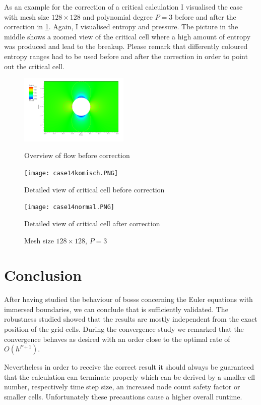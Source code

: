 	As an example for the correction of a critical calculation I visualised the case with mesh size $128 \times 128$ and polynomial degree $P = 3$ before and after the correction in \ref{fig:case14}. Again, I visualised entropy and pressure. The picture in the middle shows a zoomed view of the critical cell where a high amount of entropy was produced and lead to the breakup. Please remark that differently coloured entropy ranges had to be used before and after the correction in order to point out the critical cell.
	\begin{figure}[htp]
		\centering
		\begin{minipage}[b]{0.28\textwidth}
			\centering
			\includegraphics[height=3.3cm]{img/case14.PNG}
			\caption*{Overview of flow before correction}
		\end{minipage}
		\quad
		\begin{minipage}[b]{0.28\textwidth}
			\centering
			\texttt{[image: case14komisch.PNG]}
			\caption*{Detailed view of critical cell before correction}
			\label{fig:case14detail}
		\end{minipage}
		\quad
		\begin{minipage}[b]{0.28\textwidth}
			\centering
			\texttt{[image: case14normal.PNG]}
			\caption*{Detailed view of critical cell after correction}
			\label{fig:case14detailneu}
		\end{minipage}
		\caption{Mesh size $128 \times 128$, $P = 3$}
		\label{fig:case14}
	\end{figure}
	
	\section{Conclusion}
	
	After having studied the behaviour of \gls{bosss} concerning the Euler equations with immersed boundaries, we can conclude that is sufficiently validated. The robustness studied showed that the results are mostly independent from the exact position of the grid cells. During the convergence study we remarked  that the convergence behaves as desired with an order close to the optimal rate of $O(h^{P+1})$. 
	
	Nevertheless in order to receive the correct result it should always be guaranteed that the calculation can terminate properly which can be derived by a smaller \gls{cfl} number, respectively time step size, an increased node count safety factor or smaller cells. Unfortunately these precautions cause a higher overall runtime.
	

